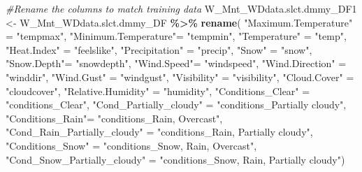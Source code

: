 \documentclass[
]{article}
\newenvironment{Shaded}{\begin{snugshade}}{\end{snugshade}}
\newcommand{\CommentTok}[1]{\textcolor[rgb]{0.56,0.35,0.01}{\textit{#1}}}
\newcommand{\DecValTok}[1]{\textcolor[rgb]{0.00,0.00,0.81}{#1}}
\newcommand{\FunctionTok}[1]{\textcolor[rgb]{0.13,0.29,0.53}{\textbf{#1}}}
\newcommand{\NormalTok}[1]{#1}
\newcommand{\OtherTok}[1]{\textcolor[rgb]{0.56,0.35,0.01}{#1}}
\newcommand{\SpecialCharTok}[1]{\textcolor[rgb]{0.81,0.36,0.00}{\textbf{#1}}}
\newcommand{\StringTok}[1]{\textcolor[rgb]{0.31,0.60,0.02}{#1}}
\begin{document}
\begin{Shaded}
\begin{Highlighting}[]
\CommentTok{\#Rename the columns to match training data }
\NormalTok{W\_Mnt\_WDdata.slct.dmmy\_DF1 }\OtherTok{\textless{}{-}}\NormalTok{ W\_Mnt\_WDdata.slct.dmmy\_DF }\SpecialCharTok{\%\textgreater{}\%} 
        \FunctionTok{rename}\NormalTok{( }
          \StringTok{"Maximum.Temperature"} \OtherTok{=} \StringTok{"tempmax"}\NormalTok{,}
          \StringTok{"Minimum.Temperature"}\OtherTok{=} \StringTok{"tempmin"}\NormalTok{,}
          \StringTok{"Temperature"} \OtherTok{=} \StringTok{"temp"}\NormalTok{,}
          \StringTok{"Heat.Index"} \OtherTok{=} \StringTok{"feelslike"}\NormalTok{,}
          \StringTok{"Precipitation"} \OtherTok{=} \StringTok{"precip"}\NormalTok{,}
          \StringTok{"Snow"} \OtherTok{=} \StringTok{"snow"}\NormalTok{,}
          \StringTok{"Snow.Depth"}\OtherTok{=} \StringTok{"snowdepth"}\NormalTok{,}
          \StringTok{"Wind.Speed"}\OtherTok{=} \StringTok{"windspeed"}\NormalTok{,}
          \StringTok{"Wind.Direction"} \OtherTok{=} \StringTok{"winddir"}\NormalTok{,}
          \StringTok{"Wind.Gust"} \OtherTok{=} \StringTok{"windgust"}\NormalTok{,}
          \StringTok{"Visibility"} \OtherTok{=} \StringTok{"visibility"}\NormalTok{,}
          \StringTok{"Cloud.Cover"} \OtherTok{=} \StringTok{"cloudcover"}\NormalTok{,}
          \StringTok{"Relative.Humidity"} \OtherTok{=} \StringTok{"humidity"}\NormalTok{,}
          \StringTok{"Conditions\_Clear"} \OtherTok{=} \StringTok{"conditions\_Clear"}\NormalTok{,}
          \StringTok{"Cond\_Partially\_cloudy"} \OtherTok{=} \StringTok{"conditions\_Partially cloudy"}\NormalTok{,}
          \StringTok{"Conditions\_Rain"}\OtherTok{=} \StringTok{"conditions\_Rain, Overcast"}\NormalTok{,}
          \StringTok{"Cond\_Rain\_Partially\_cloudy"} \OtherTok{=} \StringTok{"conditions\_Rain, Partially cloudy"}\NormalTok{,}
          \StringTok{"Conditions\_Snow"} \OtherTok{=} \StringTok{"conditions\_Snow, Rain, Overcast"}\NormalTok{,}
          \StringTok{"Cond\_Snow\_Partially\_cloudy"} \OtherTok{=} \StringTok{"conditions\_Snow, Rain, Partially cloudy"}\NormalTok{)}
\end{Highlighting}
\end{Shaded}

\begin{Shaded}
\end{Shaded}
\end{document}
